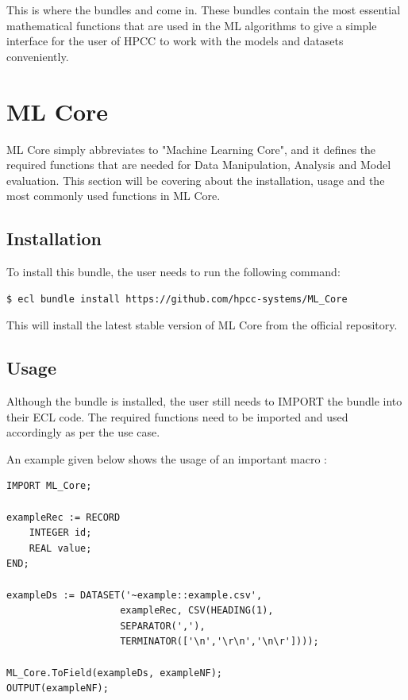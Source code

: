 This is where the bundles  and  come in. These bundles contain the most essential mathematical functions that are used in the ML algorithms to give a simple interface for the user of HPCC to work with the models and datasets conveniently.

\section{ML Core}\label{sec:mlcore}

ML Core simply abbreviates to "Machine Learning Core", and it defines the required functions that are needed for Data Manipulation, Analysis and Model evaluation. This section will be covering about the installation, usage and the most commonly used functions in ML Core.

\subsection{Installation}

To install this bundle, the user needs to run the following command:

\begin{lstlisting}[language=bash]
$ ecl bundle install https://github.com/hpcc-systems/ML_Core
\end{lstlisting}

This will install the latest stable version of ML Core from the official repository.

\subsection{Usage}

Although the bundle is installed, the user still needs to IMPORT the bundle into their ECL code. The required functions need to be imported and used accordingly as per the use case.

An example given below shows the usage of an important macro \textbf{}:

\begin{lstlisting}
IMPORT ML_Core;

exampleRec := RECORD
    INTEGER id;
    REAL value;
END;

exampleDs := DATASET('~example::example.csv', 
                    exampleRec, CSV(HEADING(1),
                    SEPARATOR(','),
                    TERMINATOR(['\n','\r\n','\n\r'])));

ML_Core.ToField(exampleDs, exampleNF);
OUTPUT(exampleNF);
\end{lstlisting}

